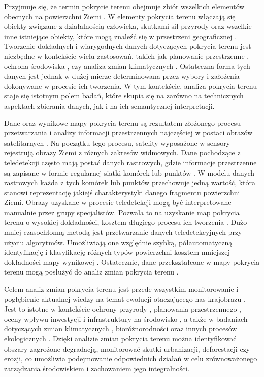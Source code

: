 \documentclass{amuthesis}
\begin{document}
Przyjmuje się, że termin pokrycie terenu obejmuje zbiór wszelkich
elementów obecnych na powierzchni Ziemi \autocite{Fisher2005}. W
elementy pokrycia terenu włączają się obiekty związane z działalnością
człowieka, skutkami sił przyrody oraz wszelkie inne istniejące obiekty,
które mogą znaleźć się w przestrzeni geograficznej
\autocite{zwolinski2018}. Tworzenie dokładnych i wiarygodnych danych
dotyczących pokrycia terenu jest niezbędne w kontekście wielu
zastosowań, takich jak planowanie przestrzenne
\autocite{bibby1999monitoring}, ochrona środowiska
\autocite{natura2000_land_cover}, czy analiza zmian klimatycznych
\autocite{dravskovic2020climate}. Ostateczna forma tych danych jest
jednak w dużej mierze determinowana przez wybory i założenia dokonywane
w procesie ich tworzenia. W tym kontekście, analiza pokrycia terenu
staje się istotnym polem badań, które skupia się na zarówno na
technicznych aspektach zbierania danych, jak i na ich semantycznej
interpretacji.

Dane oraz wynikowe mapy pokrycia terenu są rezultatem złożonego procesu
przetwarzania i analizy informacji przestrzennych najczęściej w postaci
obrazów satelitarnych
\autocite{ChangeDetectionTechniques,Jasiewicz_GeoPAT}. Na początku tego
procesu, satelity wyposażone w sensory rejestrują obrazy Ziemi z różnych
zakresów widmowych. Dane pochodzące z teledetekcji często mają postać
danych rastrowych, gdzie informacje przestrzenne są zapisane w formie
regularnej siatki komórek lub punktów \autocite{glazewski2006modele}. W
modelu danych rastrowych każda z tych komórek lub punktów przechowuje
jedną wartość, która stanowi reprezentację jakiejś charakterystyki
danego fragmentu powierzchni Ziemi. Obrazy uzyskane w procesie
teledetekcji mogą być interpretowane manualnie przez grupy specjalistów.
Pozwala to na uzyskanie map pokrycia terenu o wysokiej dokładności,
kosztem długiego procesu ich tworzenia \autocite{CUNNINGHAM2006217}.
Dużo mniej czasochłonną metodą jest przetwarzanie danych
teledetekcyjnych przy użyciu algorytmów. Umożliwiają one względnie
szybką, półautomatyczną identyfikację i klasyfikację różnych typów
powierzchni kosztem mniejszej dokładności mapy wynikowej
\autocite{CUNNINGHAM2006217}. Ostatecznie, dane przekształcone w mapy
pokrycia terenu mogą posłużyć do analiz zmian pokrycia terenu
\autocite{Feranec2007,Sleeter2013,Mierzwiak_Całka_2019}.

Celem analiz zmian pokrycia terenu jest przede wszystkim monitorowanie i
pogłębienie aktualnej wiedzy na temat ewolucji otaczającego nas
krajobrazu \autocite{ChangeDetectionTechniques}. Jest to istotne w
kontekście ochrony przyrody \autocite{lulcc_natura2000}, planowania
przestrzennego \autocite{urbanplanning}, oceny wpływu inwestycji i
infrastruktury na środowisko \autocite{infrastructure_environment}, a
także w badaniach dotyczących zmian klimatycznych
\autocite{lulcc_climate_change}, bioróżnorodności
\autocite{lulcc_biodiversity} oraz innych procesów ekologicznych
\autocite{ChangeDetectionTechniques}. Dzięki analizie zmian pokrycia
terenu można identyfikować obszary zagrożone degradacją, monitorować
skutki urbanizacji, deforestacji czy erozji, co umożliwia podejmowanie
odpowiednich działań w celu zrównoważonego zarządzania środowiskiem i
zachowaniem jego integralności.
\end{document}
